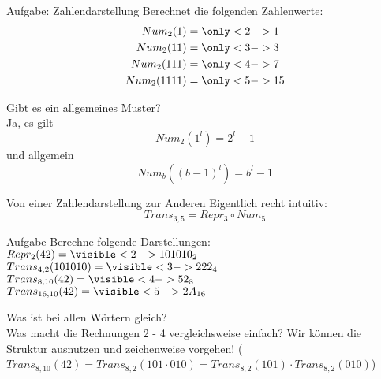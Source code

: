 \begin{frame}{Aufgabe: Zahlendarstellung}
	Berechnet die folgenden Zahlenwerte:
	\begin{align*}
		Num_2(1) &= \only<2->{1} \\
		Num_2(11) &= \only<3->{3} \\
		Num_2(111) &= \only<4->{7} \\
		Num_2(1111) &= \only<5->{15}
	\end{align*}
	
	Gibt es ein allgemeines Muster? \\ \pause[6]
	Ja, es gilt $$Num_2(1^l) = 2^l - 1$$ und allgemein $$Num_b((b-1)^l) = b^l - 1$$
\end{frame}



\begin{frame}{Von einer Zahlendarstellung zur Anderen}
	Eigentlich recht intuitiv:
	$$Trans_{3,5} = Repr_3 \circ Num_5$$
	
	\begin{block}{Aufgabe}
		Berechne folgende Darstellungen:\\
		$Repr_2(42) = \visible<2->{ 101010_2}$ \\
		$Trans_{4,2}(101010) = \visible<3->{ 222_4}$ \\
		$Trans_{8,10}(42) = \visible<4->{ 52_8}$ \\
		$Trans_{16,10}(42) = \visible<5->{ 2A_{16}}$
	\end{block}

	Was ist bei allen Wörtern gleich?  \\
	Was macht die Rechnungen 2 - 4 vergleichsweise einfach? \pause[6] Wir können die Struktur ausnutzen und zeichenweise vorgehen! ($Trans_{8,10}(42) = Trans_{8,2}(101 \cdot 010) = Trans_{8,2}(101) \cdot Trans_{8,2}(010)$)
\end{frame}






%

